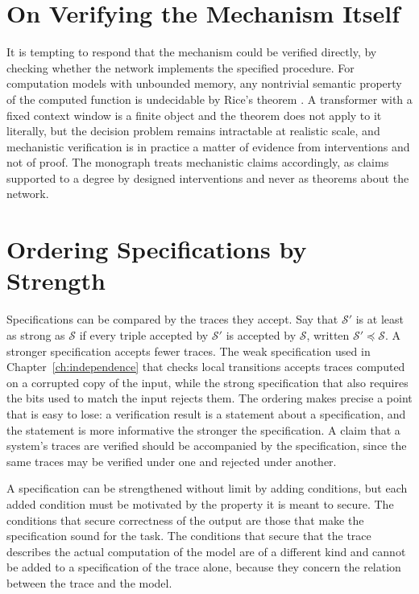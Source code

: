 \section{On Verifying the Mechanism Itself}

It is tempting to respond that the mechanism could be verified directly, by checking whether the network implements the specified procedure. For computation models with unbounded memory, any nontrivial semantic property of the computed function is undecidable by Rice's theorem \cite{rice1953}. A transformer with a fixed context window is a finite object and the theorem does not apply to it literally, but the decision problem remains intractable at realistic scale, and mechanistic verification is in practice a matter of evidence from interventions and not of proof. The monograph treats mechanistic claims accordingly, as claims supported to a degree by designed interventions and never as theorems about the network.

\section{Ordering Specifications by Strength}

Specifications can be compared by the traces they accept. Say that $\mathcal S'$ is at least as strong as $\mathcal S$ if every triple accepted by $\mathcal S'$ is accepted by $\mathcal S$, written $\mathcal S'\preceq\mathcal S$. A stronger specification accepts fewer traces. The weak specification used in Chapter~\ref{ch:independence} that checks local transitions accepts traces computed on a corrupted copy of the input, while the strong specification that also requires the bits used to match the input rejects them. The ordering makes precise a point that is easy to lose: a verification result is a statement about a specification, and the statement is more informative the stronger the specification. A claim that a system's traces are verified should be accompanied by the specification, since the same traces may be verified under one and rejected under another.

A specification can be strengthened without limit by adding conditions, but each added condition must be motivated by the property it is meant to secure. The conditions that secure correctness of the output are those that make the specification sound for the task. The conditions that secure that the trace describes the actual computation of the model are of a different kind and cannot be added to a specification of the trace alone, because they concern the relation between the trace and the model.

